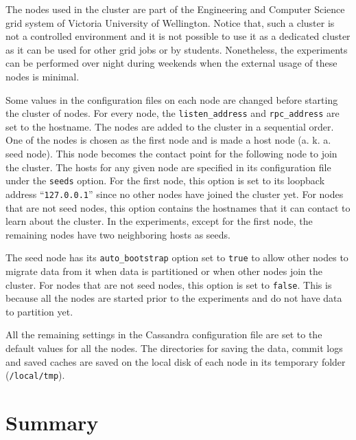  


The nodes used in the cluster are part of the Engineering and Computer Science
grid system of Victoria University of Wellington.  Notice that,  such a cluster is
not a controlled environment and it is not possible to use it as  a dedicated
cluster as it can be used for other grid jobs or  by students. 
Nonetheless,  the experiments can be performed over night during weekends when
the external usage of these nodes is minimal. 

Some values in the configuration files on each node are changed before starting
the cluster of nodes.   For every node,   the \texttt{listen\_address} and
\texttt{rpc\_address} are set to the hostname.   The nodes are added to the
cluster in a sequential order.   One of the nodes is chosen as the first node
and is made a host node (a. k. a.  seed node).  This node becomes the contact
point for the following node to join the cluster.  The hosts for any given node
are specified in its configuration file under the \texttt{seeds} option.   For
the first node,  this option is set to its loopback address
``\texttt{127.0.0.1}'' since no other nodes have joined the cluster yet.   For
nodes that are not seed nodes,  this option contains the hostnames that it can
contact to learn about the cluster.   In the experiments,   except for the first
node,  the remaining nodes have two
neighboring hosts  as seeds.  

The seed node has its \texttt{auto\_bootstrap} option set to \texttt{true} to
allow other nodes to migrate data from it when data is partitioned or when other
nodes join the cluster.   For nodes that are not seed nodes,   this option is set
to \texttt{false}.   This is because all the nodes are started prior to the 
experiments and do not have data to partition yet.  
 

All the remaining
settings in the Cassandra configuration file are set to the  default values
for all the nodes.   The directories for saving the data,   commit logs and saved
caches are saved on the local disk of each node in its temporary
folder  (\texttt{/local/tmp}). 









\section{Summary} \label{sexp:Summary} 

